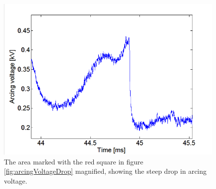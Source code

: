 \documentclass[10pt,b5paper,twoside]{article}
\begin{document}
\begin{figure}[H]
\centering
\includegraphics[scale=0.6, angle =0 ]{Bilder/Results/zoomArcingVoltageDrop.PNG}
\caption{The area marked with the red square in figure \ref{fig:arcingVoltageDrop} magnified, showing the steep drop in arcing voltage.} \label{fig:arcingVoltageDrop_zoomed}
\end{figure}
\end{document}
